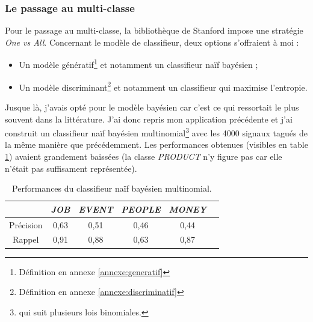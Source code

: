             \subsubsection{Le passage au multi-classe}
                Pour le passage au multi-classe, la bibliothèque de Stanford impose une stratégie \textit{One vs All}. Concernant le modèle de classifieur, deux options s'offraient à moi :
                \begin{itemize}
                    \item Un modèle génératif\footnote{Définition en annexe \ref{annexe:generatif}} et notamment un classifieur naïf bayésien ;
                    \item Un modèle discriminant\footnote{Définition en annexe \ref{annexe:discriminatif}} et notamment un classifieur qui maximise l'entropie.
                \end{itemize}
                Jusque là, j'avais opté pour le modèle bayésien car c'est ce qui ressortait le plus souvent dans la littérature. J'ai donc repris mon application précédente et j'ai construit un classifieur naïf bayésien multinomial\footnote{qui suit plusieurs lois binomiales.} avec les 4000 signaux tagués de la même manière que précédemment. Les performances obtenues (visibles en table \ref{tab:classif_perf2}) avaient grandement baissées (la classe \textit{PRODUCT} n'y figure pas car elle n'était pas suffisament représentée).
                \begin{table}[h]
                    \centering
                    \begin{tabular}{| c | c | c | c | c | c |}
                        \hline
                         & \textit{JOB} & \textit{EVENT} & \textit{PEOPLE} & \textit{MONEY} \\
                        \hline
                        Précision & 0,63 & 0,51 & 0,46 & 0,44 \\
                        Rappel & 0,91 & 0,88 & 0,63 & 0,87 \\
                        \hline
                    \end{tabular}
                    \caption{Performances du classifieur naïf bayésien multinomial.}
                    \label{tab:classif_perf2}
                \end{table}

